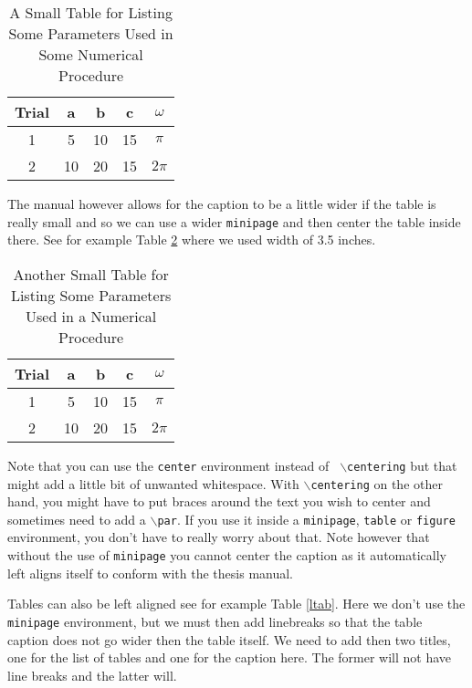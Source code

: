 \begin{table}[hbt]
\centering
\begin{minipage}{1.9in}
 \caption{A Small Table for Listing Some Parameters Used in Some
          Numerical Procedure\label{tab1}}
 \begin{tabular}{|c||c|c|c|c||}    \hline
  Trial &	a  &  b & c & $\omega$ \\ \hline \hline
  1 & 5 & 10  & 15 & $\pi$ \\ \hline
  2 & 10 & 20  & 15 & $2\pi$ \\ \hline
 \end{tabular}
\end{minipage}
\end{table}
%

The manual however allows for the caption to be a little wider if the table
is really small and so we can use a wider {\tt minipage} and then center
the table inside there.  See for example Table \ref{wtab} where we used
width of 3.5 inches.
%
\begin{table}[hbt]
\centering
\begin{minipage}{3.5in}
  \centering
  \caption{Another Small Table for Listing Some Parameters Used in a
           Numerical Procedure\label{wtab}}
   \begin{tabular}{|c||c|c|c|c||}    \hline
    Trial &	a  &  b & c & $\omega$ \\ \hline \hline
    1 & 5 & 10  & 15 & $\pi$ \\ \hline
    2 & 10 & 20  & 15 & $2\pi$ \\ \hline
   \end{tabular}
\end{minipage}
\end{table}

Note that you can use the {\tt center} environment instead of {\tt
$\backslash$centering} but that might add a little bit of unwanted
whitespace.  With {\tt $\backslash$centering} on the other hand, you
might have to put braces around the text you wish to center and
sometimes need to add a {\tt $\backslash$par}.  If you use it inside
a {\tt minipage}, {\tt table} or {\tt figure} environment, you don't have
to really worry about that.  Note however that without the use of
{\tt minipage} you cannot center the caption as it automatically left aligns
itself to conform with the thesis manual.

Tables can also be left aligned see for example Table \ref{ltab}.  Here we
don't use the {\tt minipage} environment, but we must then add linebreaks
so that the table caption does not go wider then the table itself.  We need
to add then two titles, one for the list of tables and one for the caption
here.  The former will not have line breaks and the latter will.

